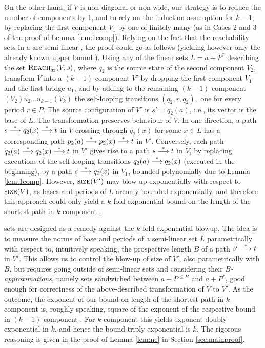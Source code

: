 On the other hand, if $V$ is non-diagonal or non-wide, our strategy is to reduce the number of components
by 1, and to rely on the induction assumption for $k-1$,
by replacing the first component $V_1$ 
by one of finitely many \geomvass 
(as in Cases 2 and 3 of the proof of Lemma \ref{lem:1comp}).
Relying on the fact that the reachability sets in a \geomvass are semi-linear \cite{DBLP:conf/icalp/FuYZ24},
the proof could go as follows (yielding however only the
already known \tower upper bound \cite{DBLP:conf/icalp/FuYZ24}).
%
Using any of the linear sets $L = a +P^*$
describing the set $\textsc{Reach}_{q_2}(V,s)$, where $q_2$
is the source state of the second component $V_2$,
transform $V$ into a $(k-1)$-component \tvass $V'$ by dropping the first component $V_1$
and the first bridge $u_1$, and by adding to the remaining $(k-1)$-component
\tvass $(V_2)u_2 \ldots u_{k-1}(V_k)$ the self-looping transitions
$
(q_2, r, q_2),
$
one for every period $r\in P$.
The source configuration of $V'$ is $s' = q_2(a)$, i.e., its vector is the base of $L$.
The transformation preserves behaviour of $V$.
In one direction, a path $s\stackrel{*}{\longrightarrow} q_2(x) \stackrel{*}{\longrightarrow} t$ in $V$ crossing through $q_2(x)$ for 
some  $x\in L$ has a corresponding path $p_2(a) \stackrel{*}{\longrightarrow} p_2(x)\stackrel{*}{\longrightarrow} t$ in $V'$.
Conversely, each path $q_2(a) \stackrel{*}{\longrightarrow} q_2(x) \stackrel{*}{\longrightarrow} t$ in $V'$
gives rise to a path $s\stackrel{*}{\longrightarrow} t$ in $V$, by replacing executions of the self-looping transitions
$q_2(a) \stackrel{*}{\longrightarrow} q_2(x)$
(\mywlog executed in the beginning), by a path $s\stackrel{*}{\longrightarrow} q_2(x)$ in $V_1$,
bounded polynomially due to Lemma \ref{lem:1comp}.
However, $\textsc{size}(V')$ may blow-up exponentially with respect to $\textsc{size}(V)$, as bases and periods
of $L$ areonly bounded exponentially, 
and therefore
this approach could only yield a $k$-fold exponential bound on the length of the shortest path
in $k$-component \tvass.


\Sandwich sets are designed as a remedy against the $k$-fold exponential blowup.
The idea is to measure the norms of base and periods of a semi-linear set $L$ 
parametrically with respect to, intuitively speaking, 
the prospective length $B$ of a path $s'\stackrel{*}{\longrightarrow} t$ in $V'$.
This allows us to control the blow-up of size of $V'$,
also parametrically with $B$, but requires
going outside of semi-linear sets and considering their \emph{$B$-approximations},
namely sets sandwiched between $a+P^{\leq B}$ and $a+P^*$,
good enough for correctness of the above-described transformation
of $V$ to $V'$.
As the outcome, the exponent of our bound on length of the shortest path in $k$-component \tvass
is, roughly speaking, square of the exponent of the respective bound in $(k-1)$-component \tvass. 
For $k$-component \tvass this yields exponent doubly-exponential in $k$, and hence the bound triply-exponential is $k$.
The rigorous reasoning is given in the proof of Lemma \ref{lem:ne} in Section \ref{sec:mainproof}.


